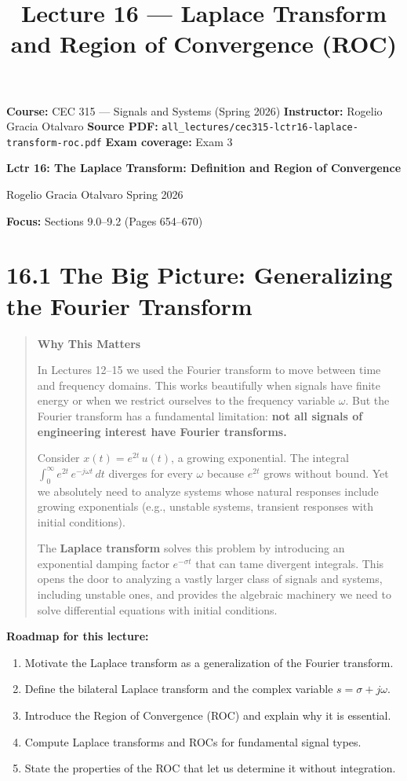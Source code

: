 \documentclass[11pt]{article}
\title{Lecture 16 — Laplace Transform and Region of Convergence (ROC)}
\author{}
\date{}
\begin{document}
\maketitle

\textbf{Course:} CEC 315 — Signals and Systems (Spring 2026)
\textbf{Instructor:} Rogelio Gracia Otalvaro
\textbf{Source PDF:} \texttt{all\_lectures/cec315-lctr16-laplace-transform-roc.pdf}
\textbf{Exam coverage:} Exam 3

\textbf{Lctr 16: The Laplace Transform: Definition and Region of Convergence}

Rogelio Gracia Otalvaro
Spring 2026

\textbf{Focus:} Sections 9.0–9.2 (Pages 654–670)

\section*{16.1 The Big Picture: Generalizing the Fourier Transform}

\begin{quote}
\textbf{Why This Matters}

In Lectures 12–15 we used the Fourier transform to move between time and frequency domains. This works beautifully when signals have finite energy or when we restrict ourselves to the frequency variable $\omega$. But the Fourier transform has a fundamental limitation: \textbf{not all signals of engineering interest have Fourier transforms.}

Consider $x(t) = e^{2t}\,u(t)$, a growing exponential. The integral $\int_0^{\infty} e^{2t}\,e^{-j\omega t}\,dt$ diverges for every $\omega$ because $e^{2t}$ grows without bound. Yet we absolutely need to analyze systems whose natural responses include growing exponentials (e.g., unstable systems, transient responses with initial conditions).

The \textbf{Laplace transform} solves this problem by introducing an exponential damping factor $e^{-\sigma t}$ that can tame divergent integrals. This opens the door to analyzing a vastly larger class of signals and systems, including unstable ones, and provides the algebraic machinery we need to solve differential equations with initial conditions.
\end{quote}

\textbf{Roadmap for this lecture:}

\begin{enumerate}
  \item Motivate the Laplace transform as a generalization of the Fourier transform.
  \item Define the bilateral Laplace transform and the complex variable $s = \sigma + j\omega$.
  \item Introduce the Region of Convergence (ROC) and explain why it is essential.
  \item Compute Laplace transforms and ROCs for fundamental signal types.
  \item State the properties of the ROC that let us determine it without integration.
\end{enumerate}
\end{document}
